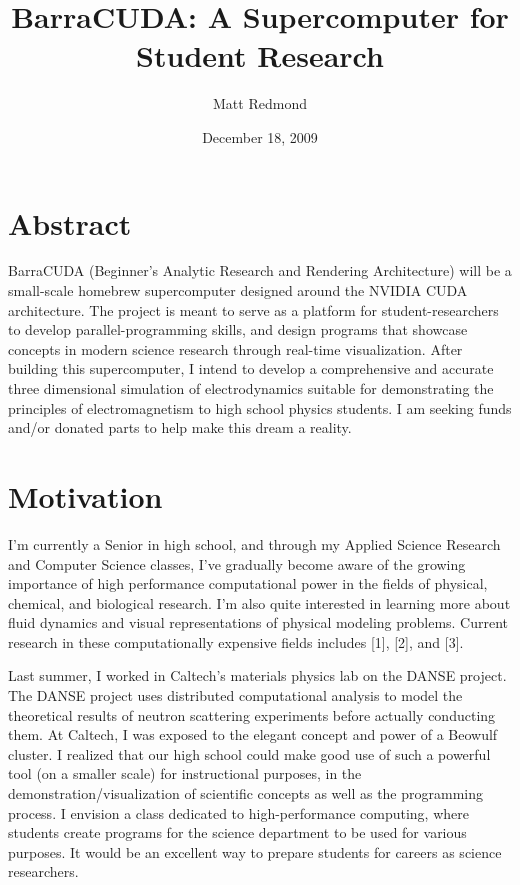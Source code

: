\documentclass{article}      %
\title{BarraCUDA: A Supercomputer for Student Research}  %
\author{Matt Redmond}      %
\date{December 18, 2009}
\begin{document}
\maketitle

\section{Abstract}
BarraCUDA (Beginner's Analytic Research and Rendering Architecture) will be a small-scale homebrew supercomputer designed around the NVIDIA CUDA architecture. The project is meant to serve as a platform for student-researchers to develop parallel-programming skills, and design programs that showcase concepts in modern science research through real-time visualization. After building this supercomputer, I intend to develop a comprehensive and accurate three dimensional simulation of electrodynamics suitable for demonstrating the principles of electromagnetism to high school physics students. I am seeking funds and/or donated parts to help make this dream a reality.

\section{Motivation}
I'm currently a Senior in high school, and through my Applied Science Research and Computer Science classes, I've gradually become aware of the growing importance of high performance computational power in the fields of physical, chemical, and biological research. I'm also quite interested in learning more about fluid dynamics and visual representations of physical modeling problems. Current research in these computationally expensive fields includes [1], [2], and [3]. 

Last summer, I worked in Caltech's materials physics lab on the DANSE project. The DANSE project uses distributed computational analysis to model the theoretical results of neutron scattering experiments before actually conducting them. At Caltech, I was exposed to the elegant concept and power of a Beowulf cluster. I realized that our high school could make good use of such a powerful tool (on a smaller scale) for instructional purposes, in the demonstration/visualization of scientific concepts as well as the programming process. I envision a class dedicated to high-performance computing, where students create programs for the science department to be used for various purposes. It would be an excellent way to prepare students for careers as science researchers.
\end{document}
